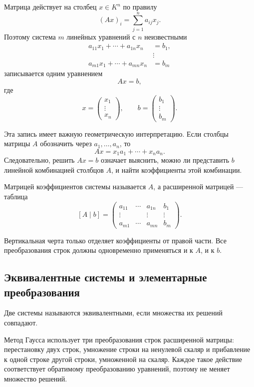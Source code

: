 Матрица действует на столбец \(x\in K^n\) по правилу
\[
(Ax)_i=\sum_{j=1}^n a_{ij}x_j.
\]
Поэтому система \(m\) линейных уравнений с \(n\) неизвестными
\[
\begin{aligned}
a_{11}x_1+\cdots+a_{1n}x_n&=b_1,\\
&\vdots\\
a_{m1}x_1+\cdots+a_{mn}x_n&=b_m
\end{aligned}
\]
записывается одним уравнением
\[
Ax=b,
\]
где
\[
x=
\begin{pmatrix}
x_1\\ \vdots\\ x_n
\end{pmatrix},
\qquad
b=
\begin{pmatrix}
b_1\\ \vdots\\ b_m
\end{pmatrix}.
\]

Эта запись имеет важную геометрическую интерпретацию. Если столбцы матрицы \(A\) обозначить через \(a_1,\dots,a_n\), то
\[
Ax=x_1a_1+\cdots+x_na_n.
\]
Следовательно, решить \(Ax=b\) означает выяснить, можно ли представить \(b\) линейной комбинацией столбцов \(A\), и найти коэффициенты этой комбинации.

\begin{definition}
Матрицей коэффициентов системы называется \(A\), а расширенной матрицей --- таблица
\[
[A\mid b]
=
\left(
\begin{array}{ccc|c}
a_{11}&\cdots&a_{1n}&b_1\\
\vdots&&\vdots&\vdots\\
a_{m1}&\cdots&a_{mn}&b_m
\end{array}
\right).
\]
\end{definition}

Вертикальная черта только отделяет коэффициенты от правой части. Все преобразования строк должны одновременно применяться и к \(A\), и к \(b\).

\subsection{Эквивалентные системы и элементарные преобразования}

\begin{definition}
Две системы называются эквивалентными, если множества их решений совпадают.
\end{definition}

Метод Гаусса использует три преобразования строк расширенной матрицы:
перестановку двух строк, умножение строки на ненулевой скаляр и прибавление к одной строке другой строки, умноженной на скаляр. Каждое такое действие соответствует обратимому преобразованию уравнений, поэтому не меняет множество решений.

